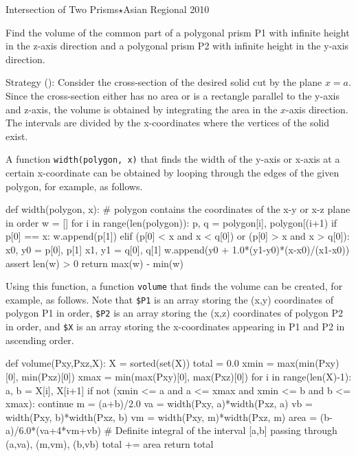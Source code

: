 \begin{versionbeta}
\begin{pbox}{Intersection of Two Prisms$\star$}{Asian Regional 2010}

Find the volume of the common part of a polygonal prism P1 with infinite height in the z-axis direction and a polygonal prism P2 with infinite height in the y-axis direction.

\end{pbox}

Strategy (\pccbook[pp.~236--]): Consider the cross-section of the desired solid cut by the plane $x=a$.
Since the cross-section either has no area or is a rectangle parallel to the y-axis and z-axis, the volume is obtained by integrating the area in the $x$-axis direction. The intervals are divided by the x-coordinates where the vertices of the solid exist.

A function \texttt{width(polygon, x)} that finds the width of the y-axis or x-axis at a certain x-coordinate can be obtained by looping through the edges of the given polygon, for example, as follows.

\begin{pybox}[emph={width},emph={[2]w}]
def width(polygon, x): # polygon contains the coordinates of the x-y or x-z plane in order
    w = []
    for i in range(len(polygon)):
        p, q = polygon[i], polygon[(i+1)%
        if p[0] == x:
            w.append(p[1])
        elif (p[0] < x and x < q[0]) or (p[0] > x and x > q[0]):
            x0, y0 = p[0], p[1]
            x1, y1 = q[0], q[1]
            w.append(y0 + 1.0*(y1-y0)*(x-x0)/(x1-x0))
    assert len(w) > 0
    return max(w) - min(w)
\end{pybox}

Using this function, a function \texttt{volume} that finds the volume can be created, for example, as follows. Note that \texttt{\$P1} is an array storing the (x,y) coordinates of polygon P1 in order, \texttt{\$P2} is an array storing the (x,z) coordinates of polygon P2 in order, and \texttt{\$X} is an array storing the x-coordinates appearing in P1 and P2 in ascending order.

\begin{pybox}[emph={volume},emph={[2]width,total}]
def volume(Pxy,Pxz,X):
    X = sorted(set(X))
    total = 0.0
    xmin = max(min(Pxy)[0], min(Pxz)[0])
    xmax = min(max(Pxy)[0], max(Pxz)[0])
    for i in range(len(X)-1):
        a, b = X[i], X[i+1]
        if not (xmin <= a and a <= xmax and xmin <= b and b <= xmax):
            continue
        m = (a+b)/2.0
        va = width(Pxy, a)*width(Pxz, a)
        vb = width(Pxy, b)*width(Pxz, b)
        vm = width(Pxy, m)*width(Pxz, m)
        area = (b-a)/6.0*(va+4*vm+vb) # Definite integral of the interval [a,b] passing through (a,va), (m,vm), (b,vb)
        total += area
    return total
\end{pybox}


\end{versionbeta}
